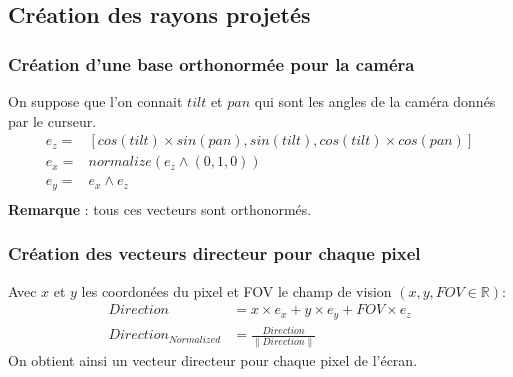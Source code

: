 \subsection{Création des rayons projetés}
\subsubsection{Création d'une base orthonormée pour la caméra}

On suppose que l'on connait $tilt$ et $pan$ qui sont les angles de la caméra donnés par le curseur. 
\begin{align*}
    e_z =&  [cos(tilt)\times sin(pan) , sin(tilt) , cos(tilt)\times cos(pan)]\\
    e_x =&  normalize(e_z \wedge (0,1,0) )\\
    e_y =& e_x \wedge e_z\\
\end{align*}
\textbf{Remarque} : tous ces vecteurs sont orthonormés.
\subsubsection{Création des vecteurs directeur pour chaque pixel}
Avec $x$ et $y$ les coordonées du pixel et FOV le champ de vision $(x,y,FOV\in \mathbb{R})$: 
\begin{align*}
    Direction &= x\times e_x + y\times e_y + FOV\times e_z\\
    Direction_{Normalized} &= \frac{Direction}{\|Direction\|}
\end{align*}
On obtient ainsi un vecteur directeur pour chaque pixel de l'écran.